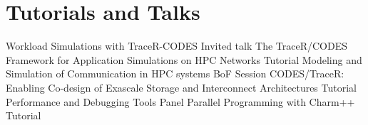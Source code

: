 \section{Tutorials and Talks}
		{Workload Simulations with TraceR-CODES}
		{Invited talk}
		{}{}
		{The TraceR/CODES Framework for Application Simulations on HPC Networks}
		{Tutorial}
		{}{}
		{Modeling and Simulation of Communication in HPC systems}
		{BoF Session}
		{}{}
		{CODES/TraceR: Enabling Co-design of Exascale Storage and Interconnect Architectures}
		{Tutorial}
		{}{}
		{Performance and Debugging Tools}
		{Panel}
		{}{}
		{Parallel Programming with Charm++}
		{Tutorial}
		{}{}

